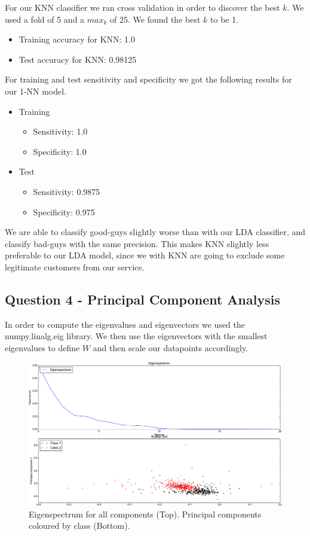 \documentclass[12pt]{article}
\begin{document}
For our KNN classifier we ran cross validation in order to discover the best $k$. We used a fold of 5 and a $max_k$ of 25. We found the best $k$ to be 1.

\begin{itemize}
	\item Training accuracy for KNN: 1.0
	\item Test accuracy for KNN: 0.98125
\end{itemize}

\noindent For training and test sensitivity and specificity we got the following results for our 1-NN model.

\begin{itemize}
	\item Training
		\begin{itemize}
			\item Sensitivity: 1.0
			\item Specificity: 1.0
		\end{itemize}
	\item Test
		\begin{itemize}
			\item Sensitivity: 0.9875
			\item Specificity: 0.975
		\end{itemize}
\end{itemize}

\noindent We are able to classify good-guys slightly worse than with our LDA classifier, and classify bad-guys with the same precision. This makes KNN slightly less preferable to our LDA model, since we with KNN are going to exclude some legitimate customers from our service.

\newpage

\subsection{Question 4 - Principal Component Analysis}

In order to compute the eigenvalues and eigenvectors we used the numpy.linalg.eig library. We then use the eigenvectors with the smallest eigenvalues to define $W$ and then scale our datapoints accordingly.

\begin{figure}[H]
	\includegraphics[scale=0.45]{principal_component_analysis.png}
	\caption{Eigenspectrum for all components (Top). Principal components coloured by class (Bottom).}
	\label{fig:svr_linear_regression}
\end{figure}
\end{document}
